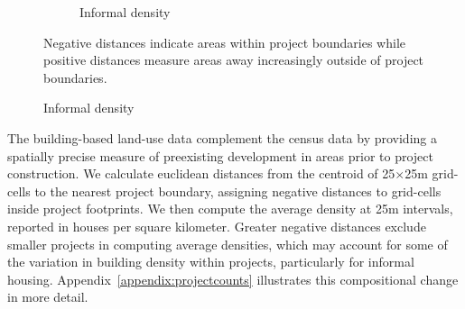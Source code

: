 \documentclass[12pt]{article}
\begin{document}
\begin{figure}[h!]
\begin{subfigure}[b]{0.495\textwidth}
            \caption[]%
            {{\small Informal density}}    
            \label{fig:preinf_raw}
        \end{subfigure}
        \label{fig:rawbblumeans_het}
   {\scriptsize Negative distances indicate areas within project boundaries while positive distances measure areas away increasingly outside of project boundaries.} %
    \end{figure} 


The building-based land-use data complement the census data by providing a spatially precise measure of preexisting development in areas prior to project construction.  We calculate euclidean distances from the centroid of 25$\times$25m grid-cells to the nearest project boundary, assigning negative distances to grid-cells inside project footprints.  We then compute the average density at 25m intervals, reported in houses per square kilometer.  Greater negative distances exclude smaller projects in computing average densities, which may account for some of the variation in building density within projects, particularly for informal housing.  Appendix~\ref{appendix:projectcounts} illustrates this compositional change in more detail.  
\end{document}
